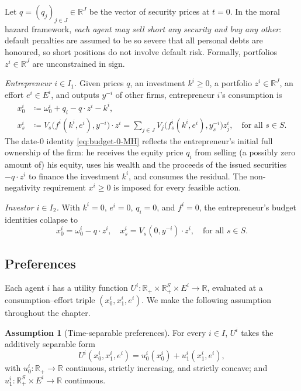 \documentclass[11pt,a4paper,oneside]{book}
\def\R{\mathbb{R}}
\def\geq{\geqslant}
\theoremstyle{plain}
\theoremstyle{definition}
\newtheorem{assumption}[theorem]{Assumption}
\theoremstyle{remark}
\numberwithin{equation}{chapter}
\begin{document}
Let $q = (q_j)_{j \in J} \in \R^J$ be the vector of security prices at $t=0$.
In the moral hazard framework, \emph{each agent may sell short any security and buy any other}: default penalties are assumed to be so severe that all personal debts are honoured, so short positions do not involve default risk.
Formally, portfolios $z^i \in \R^J$ are unconstrained in sign.

\emph{Entrepreneur $i \in I_1$.}
Given prices $q$, an investment $k^i \geq 0$, a portfolio $z^i \in \R^J$, an effort $e^i \in E^i$, and outputs $y^{-i}$ of other firms, entrepreneur $i$'s consumption is
\begin{align}
  x^i_0
  &\coloneqq \omega^i_0 + q_i - q \cdot z^i - k^i,
  \label{eq:budget-0-MH}\\[2pt]
  x^i_s
  &\coloneqq V_s\bigl( f^i(k^i, e^i), y^{-i} \bigr) \cdot z^i
  = \sum_{j \in J} V_j\bigl( f^i_s(k^i, e^i), y^{-i}_s \bigr) z^i_j,
  \quad \text{for all $s\in S$}.
  \label{eq:budget-s-MH}
\end{align}
The date-$0$ identity \eqref{eq:budget-0-MH} reflects the entrepreneur's initial full ownership of the firm: he receives the equity price $q_i$ from selling (a possibly zero amount of) his equity, uses his wealth and the proceeds of the issued securities $-q \cdot z^i$ to finance the investment $k^i$, and consumes the residual.
The non-negativity requirement $x^i \geq 0$ is imposed for every feasible action.

\emph{Investor $i \in I_2$.}
With $k^i = 0$, $e^i = 0$, $q_i = 0$, and $f^i = 0$, the entrepreneur's budget identities collapse to
\begin{equation*}
  x^i_0 = \omega^i_0 - q \cdot z^i, \quad
  x^i_s = V_s(0, y^{-i}) \cdot z^i, \quad \text{for all $s\in S$}.
\end{equation*}

\subsection{Preferences}

Each agent $i$ has a utility function $U^i : \R_+ \times \R_+^S \times E^i \to \R$, evaluated at a consumption--effort triple $(x^i_0, x^i_1, e^i)$.
We make the following assumption throughout the chapter.

\begin{assumption}[Time-separable preferences]\label{ass:time-sep}
For every $i \in I$, $U^i$ takes the additively separable form
\begin{equation}\label{eq:time-sep}
  U^i(x^i_0, x^i_1, e^i) = u^i_0(x^i_0) + u^i_1(x^i_1, e^i),
\end{equation}
with $u^i_0 : \R_+ \to \R$ continuous, strictly increasing, and strictly concave; and $u^i_1 : \R_+^S \times E^i \to \R$ continuous.
\end{assumption}
\end{document}
